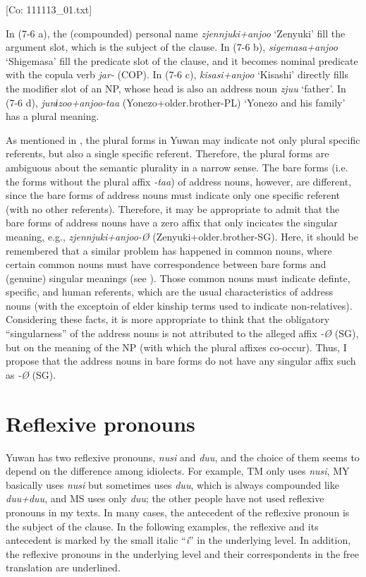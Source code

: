       [Co: 111113\_01.txt]
  \z
\z

In (7-6 a), the (compounded) personal name \textit{zjennjuki+anjoo} ‘Zenyuki’ fill the argument slot, which is the subject of the clause. In (7-6 b), \textit{sigemasa+anjoo} ‘Shigemasa’ fill the predicate slot of the clause, and it becomes nominal predicate with the copula verb \textit{jar-} (COP). In (7-6 c), \textit{kisasi+anjoo} ‘Kisashi’ directly fills the modifier slot of an NP, whose head is also an address noun \textit{zjuu} ‘father’. In (7-6 d), \textit{junɨzoo+anjoo-taa} (Yonezo+older.brother-PL) ‘Yonezo and his family’ has a plural meaning.

  As mentioned in , the plural forms in Yuwan may indicate not only plural specific referents, but also a single specific referent. Therefore, the plural forms are ambiguous about the semantic plurality in a narrow sense. The bare forms (i.e. the forms without the plural affix \textit{{}-taa}) of address nouns, however, are different, since the bare forms of address nouns must indicate only one specific referent (with no other referents). Therefore, it may be appropriate to admit that the bare forms of address nouns have a zero affix that only incicates the singular meaning, e.g., \textit{zjennjuki+anjoo-Ø} (Zenyuki+older.brother-SG). Here, it should be remembered that a similar problem has happened in common nouns, where certain common nouns must have correspondence between bare forms and (genuine) singular meanings (see ). Those common nouns must indicate definte, specific, and human referents, which are the usual characteristics of address nouns (with the exceptoin of elder kinship terms used to indicate non-relatives). Considering these facts, it is more appropriate to think that the obligatory “singularness” of the address nouns is not attributed to the alleged affix \textit{{}-Ø} (SG), but on the meaning of the NP (with which the plural affixes co-occur). Thus, I propose that the address nouns in bare forms do not have any singular affix such as \textit{{}-Ø} (SG).

\section{Reflexive pronouns}

Yuwan has two reflexive pronouns, \textit{nusi} and \textit{duu}, and the choice of them seems to depend on the difference among idiolects. For example, TM only uses \textit{nusi}, MY basically uses \textit{nusi} but sometimes uses \textit{duu}, which is always compounded like \textit{duu+duu}, and MS uses only \textit{duu}; the other people have not used reflexive pronouns in my texts. In many cases, the antecedent of the reflexive pronoun is the subject of the clause. In the following examples, the reflexive and its antecedent is marked by the small italic “\textit{i}” in the underlying level. In addition, the reflexive pronouns in the underlying level and their correspondents in the free translation are underlined.

